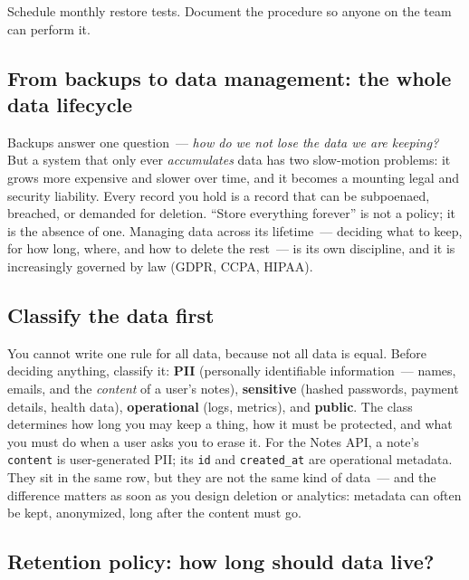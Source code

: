 \noindent{}Schedule monthly restore tests. Document the procedure so anyone on the team can perform it.

\subsection*{From backups to data management: the whole data lifecycle}\label{37-reliability:from-backups-to-data-management-the-whole-data-lifecycle}

Backups answer one question~--- \emph{how do we not lose the data we are keeping?} But a system that only ever \emph{accumulates} data has two slow-motion problems: it grows more expensive and slower over time, and it becomes a mounting legal and security liability. Every record you hold is a record that can be subpoenaed, breached, or demanded for deletion. ``Store everything forever'' is not a policy; it is the absence of one. Managing data across its lifetime~--- deciding what to keep, for how long, where, and how to delete the rest~--- is its own discipline, and it is increasingly governed by law (GDPR, CCPA, HIPAA).

\subsection*{Classify the data first}\label{37-reliability:classify-the-data-first}

You cannot write one rule for all data, because not all data is equal. Before deciding anything, classify it: \textbf{PII} (personally identifiable information~--- names, emails, and the \emph{content} of a user's notes), \textbf{sensitive} (hashed passwords, payment details, health data), \textbf{operational} (logs, metrics), and \textbf{public}. The class determines how long you may keep a thing, how it must be protected, and what you must do when a user asks you to erase it. For the Notes API, a note's \texttt{content} is user-generated PII; its \texttt{id} and \texttt{created\_at} are operational metadata. They sit in the same row, but they are not the same kind of data~--- and the difference matters as soon as you design deletion or analytics: metadata can often be kept, anonymized, long after the content must go.

\subsection*{Retention policy: how long should data live?}\label{37-reliability:retention-policy-how-long-should-data-live}

